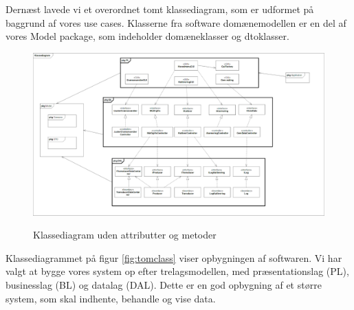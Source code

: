 Dernæst lavede vi et overordnet tomt klassediagram, som er udformet på baggrund af vores use cases. Klasserne fra software domænemodellen er en del af vores Model package, som indeholder domæneklasser og dtoklasser. 

\clearpage

\begin{figure}[h!]
	\centering
	\includegraphics[width=1\linewidth]{Arkitektur_og_design/Softwarearkitektur/tomclass}
	\label{fig:tomclass}
	\caption{Klassediagram uden attributter og metoder}
\end{figure}

Klassediagrammet på figur \vref{fig:tomclass} viser opbygningen af softwaren. Vi har valgt at bygge vores system op efter trelagsmodellen, med præsentationslag (PL), businesslag (BL) og datalag (DAL). Dette er en god opbygning af et større system, som skal indhente, behandle og vise data.
